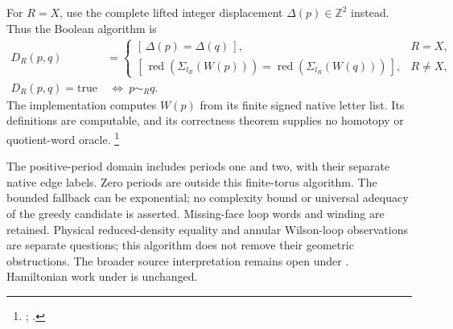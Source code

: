 \documentclass{article}
\begin{document}
For $R=X$, use the complete lifted integer displacement
$\Delta(p)\in\mathbb Z^2$ instead. Thus the Boolean algorithm is
\begin{align}
    D_R(p,q)&=
    \begin{cases}
        [\,\Delta(p)=\Delta(q)\,],&R=X,\\
        [\,\operatorname{red}(\Sigma_{l_R}(W(p)))
        =\operatorname{red}(\Sigma_{l_R}(W(q)))\,],&R\ne X,
    \end{cases}\\
    D_R(p,q)=\mathrm{true}&\ \Longleftrightarrow\ p\sim_Rq.
    \label{eq:scp10_executable_general_support}
\end{align}
The implementation computes $W(p)$ from its finite signed native letter
list. Its definitions are computable, and its correctness theorem supplies
no homotopy or quotient-word oracle.
\footnote{;
.}

The positive-period domain includes periods one and two, with their separate
native edge labels. Zero periods are outside this finite-torus algorithm.
The bounded fallback can be exponential; no complexity bound or universal
adequacy of the greedy candidate is asserted. Missing-face loop words and
winding are retained. Physical reduced-density equality and annular
Wilson-loop observations are separate questions; this algorithm does not
remove their geometric obstructions. The broader source interpretation
remains open under . Hamiltonian work under 
is unchanged.



\end{document}
